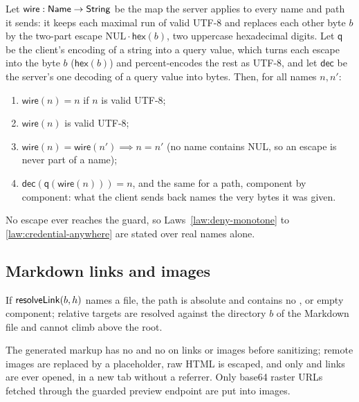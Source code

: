 \begin{law}
\label{law:wire}
Let $\mathsf{wire}:\mathsf{Name}\to\mathsf{String}$ be the map the server applies to every
name and path it sends: it keeps each maximal run of valid UTF-8 and replaces each
other byte $b$ by the two-part escape $\mathrm{NUL}\cdot\mathsf{hex}(b)$, two uppercase
hexadecimal digits.  Let $\mathsf{q}$ be the client's encoding of a string into a
query value, which turns each escape into the byte $b$ (\code{\%}$\mathsf{hex}(b)$) and
percent-encodes the rest as UTF-8, and let $\mathsf{dec}$ be the server's one decoding
of a query value into bytes.  Then, for all names $n, n'$:
\begin{enumerate}
  \item $\mathsf{wire}(n)=n$ if $n$ is valid UTF-8;
  \item $\mathsf{wire}(n)$ is valid UTF-8;
  \item $\mathsf{wire}(n)=\mathsf{wire}(n')\implies n=n'$ (no name contains NUL, so an
        escape is never part of a name);
  \item $\mathsf{dec}(\mathsf{q}(\mathsf{wire}(n)))=n$, and the same for a path, component
        by component: what the client sends back names the very bytes it was given.
\end{enumerate}
No escape ever reaches the guard, so Laws~\ref{law:deny-monotone} to
\ref{law:credential-anywhere} are stated over real names alone.
\end{law}

\subsection{Markdown links and images}

\begin{law}
\label{law:link-path}
If $\mathsf{resolveLink}(b,h)$ names a file, the path is absolute and contains no ,
 or empty component; relative targets are resolved against the
directory $b$ of the Markdown file and cannot climb above the root.
\end{law}

\begin{law}
\label{law:link-inert}
The generated markup has no  and no  on links or images
before sanitizing; remote images are replaced by a placeholder, raw HTML is
escaped, and only  and  links are ever opened, in a new
tab without a referrer.  Only base64 raster  URLs fetched through the
guarded preview endpoint are put into images.
\end{law}

